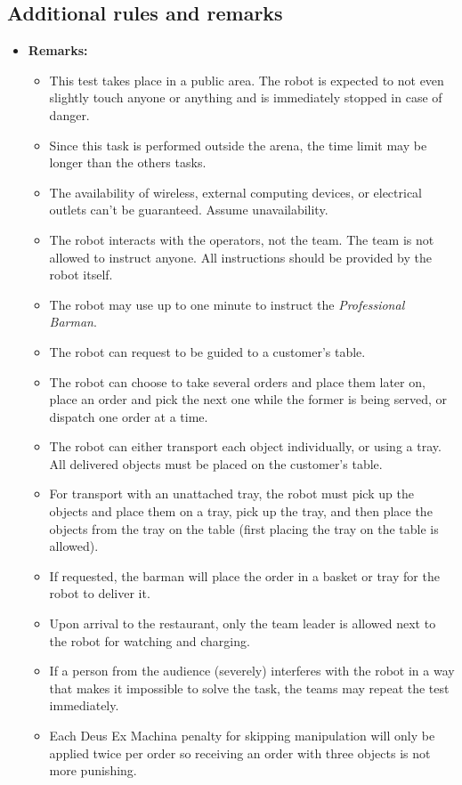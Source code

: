 \subsection*{Additional rules and remarks}
\begin{itemize}
	\item \textbf{Remarks:}
	\begin{itemize}
		\item This test takes place in a public area. The robot is expected to not even slightly touch anyone or anything and is immediately stopped in case of danger.
		\item Since this task is performed outside the arena, the time limit may be longer than the others tasks.
		\item The availability of wireless, external computing devices, or electrical outlets can't be guaranteed. Assume unavailability.
		\item The robot interacts with the operators, not the team. The team is not allowed to instruct anyone. All instructions should be provided by the robot itself.
		\item The robot may use up to one minute to instruct the \textit{Professional Barman}.
		\item The robot can request to be guided to a customer's table.
		\item The robot can choose to take several orders and place them later on, place an order and pick the next one while the former is being served, or dispatch one order at a time.
		\item The robot can either transport each object individually, or using a tray. All delivered objects must be placed on the customer's table.
		\item For transport with an unattached tray, the robot must pick up the objects and place them on a tray, pick up the tray, and then place the objects from the tray on the table (first placing the tray on the table is allowed).
		\item If requested, the barman will place the order in a basket or tray for the robot to deliver it.
		\item Upon arrival to the restaurant, only the team leader is allowed next to the robot for watching and charging.
		\item If a person from the audience (severely) interferes with the robot in a way that makes it impossible to solve the task, the teams may repeat the test immediately.
		\item Each Deus Ex Machina penalty for skipping manipulation will only be applied twice per order so receiving an order with three objects is not more punishing.

\end{itemize}
\end{itemize}
